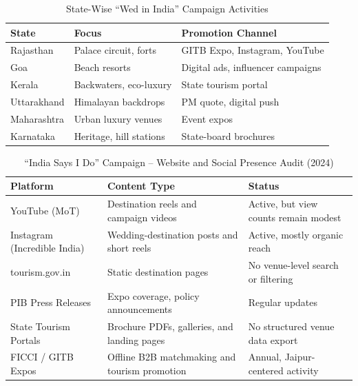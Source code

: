 \documentclass[conference]{IEEEtran}
\begin{document}
\begin{table}[htbp]
\caption{State-Wise ``Wed in India'' Campaign Activities}
\centering
\footnotesize
\renewcommand{\arraystretch}{1.08}
\begin{tabularx}{\columnwidth}{@{}l>{\raggedright\arraybackslash}X>{\raggedright\arraybackslash}X@{}}
\toprule
\textbf{State} & \textbf{Focus} & \textbf{Promotion Channel} \\
\midrule
Rajasthan & Palace circuit, forts & GITB Expo, Instagram, YouTube \\
Goa & Beach resorts & Digital ads, influencer campaigns \\
Kerala & Backwaters, eco-luxury & State tourism portal \\
Uttarakhand & Himalayan backdrops & PM quote, digital push \\
Maharashtra & Urban luxury venues & Event expos \\
Karnataka & Heritage, hill stations & State-board brochures \\
\bottomrule
\end{tabularx}
\label{tab:statewise}
\end{table}

\begin{table}[htbp]
\caption{``India Says I Do'' Campaign -- Website and Social Presence Audit (2024)}
\centering
\footnotesize
\renewcommand{\arraystretch}{1.12}
\begin{tabularx}{\textwidth}{@{}>{\raggedright\arraybackslash}p{}>{\raggedright\arraybackslash}X>{\raggedright\arraybackslash}p{}@{}}
\toprule
\textbf{Platform} & \textbf{Content Type} & \textbf{Status} \\
\midrule
YouTube (MoT) & Destination reels and campaign videos & Active, but view counts remain modest \\
Instagram (Incredible India) & Wedding-destination posts and short reels & Active, mostly organic reach \\
tourism.gov.in & Static destination pages & No venue-level search or filtering \\
PIB Press Releases & Expo coverage, policy announcements & Regular updates \\
State Tourism Portals & Brochure PDFs, galleries, and landing pages & No structured venue data export \\
FICCI / GITB Expos & Offline B2B matchmaking and tourism promotion & Annual, Jaipur-centered activity \\
\bottomrule
\end{tabularx}
\label{tab:campaign}
\end{table}
\end{document}
